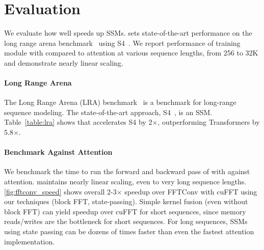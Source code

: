 \section{\fastfft Evaluation \label{sec:eval_efficiency}}
We evaluate how well \fastfft speeds up SSMs.
\fastfft sets state-of-the-art performance on the long range arena benchmark~\citep{tay2020long} using S4~\citep{gu2022efficiently}.
We report performance of training \hthree module with \fastfft compared to attention at various sequence lengths, from 256 to 32K and demonstrate nearly linear scaling.

\begin{table}[t]
    \centering
    
\end{table}

\paragraph{Long Range Arena}
The Long Range Arena (LRA) benchmark~\citep{tay2020long} is a benchmark for long-range sequence modeling.
The state-of-the-art approach, S4~\citep{gu2022train}, is an SSM.
Table~\ref{table:lra} shows that \fastfft accelerates S4 by 2$\times$, outperforming Transformers by 5.8$\times$.


\paragraph{Benchmark \hthree Against Attention}
We benchmark the time to run the forward and backward pass of \hthree with \fastfft against attention.
\fastfft maintains nearly linear scaling, even to very long sequence lengths.
\cref{fig:fftconv_speed} shows overall 2-3$\times$ speedup over FFTConv with cuFFT using our techniques
(block FFT, state-passing).
Simple kernel fusion (even without block FFT) can yield speedup over cuFFT for short sequences, since memory reads/writes are the bottleneck for short sequences.
For long sequences, SSMs using state passing can be dozens of times faster
than even the fastest attention implementation.

